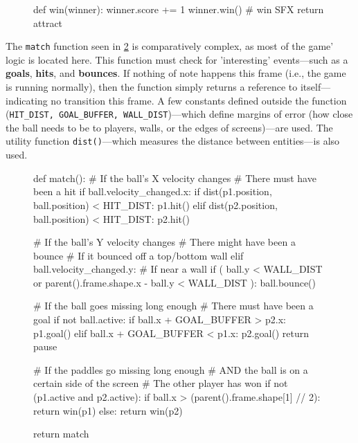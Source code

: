 \documentclass{report}
\newcommand{\state}[1]{\textbf{#1}}
\begin{document}
\begin{figure}
    \centering
    \begin{codeblock}
def win(winner):
    winner.score += 1
    winner.win() # win SFX
    return attract
\end{codeblock}
    \captionof{code}{\state{Win} logic}
    \label{code:win}
\end{figure}


The \texttt{match} function seen in \cref{code:match} is comparatively complex, as most of the game' logic is located here. This function must check for 'interesting' events---such as a \state{goals}, \state{hits}, and \state{bounces}. If nothing of note happens this frame (i.e., the game is running normally), then the function simply returns a reference to itself---indicating no transition this frame. A few constants defined outside the function (\texttt{HIT\_DIST, GOAL\_BUFFER, WALL\_DIST})---which define margins of error (how close the ball needs to be to players, walls, or the edges of screens)---are used. The utility function \texttt{dist()}---which measures the distance between entities---is also used. 

\begin{figure}
    \centering
    \begin{codeblock}
def match():
    # If the ball's X velocity changes
    # There must have been a hit
    if ball.velocity_changed.x:
        if dist(p1.position, ball.position) < HIT_DIST:
            p1.hit()
        elif dist(p2.position, ball.position) < HIT_DIST:
            p2.hit()

    # If the ball's Y velocity changes
    # There might have been a bounce
    # If it bounced off a top/bottom wall
    elif ball.velocity_changed.y:
        # If near a wall
        if (
            ball.y < WALL_DIST
            or 
            parent().frame.shape.x - ball.y < WALL_DIST
        ):
            ball.bounce()

    # If the ball goes missing long enough
    # There must have been a goal
    if not ball.active:
        if ball.x + GOAL_BUFFER > p2.x:
            p1.goal()
        elif ball.x + GOAL_BUFFER < p1.x:
            p2.goal()
        return pause

    # If the paddles go missing long enough
    # AND the ball is on a certain side of the screen
    # The other player has won
    if not (p1.active and p2.active):
        if ball.x > (parent().frame.shape[1] // 2):
            return win(p1)
        else:
            return win(p2)

    return match

\end{codeblock}
    \captionof{code}{\state{Match} logic}
    \label{code:match}
\end{figure}
\end{document}
